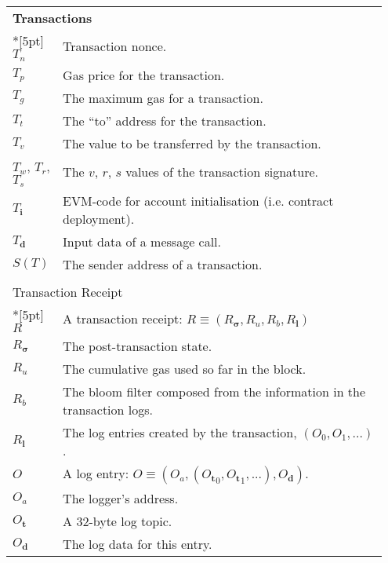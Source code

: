 \documentclass[9pt,oneside]{amsart}
\begin{document}
\begin{longtable}{p{0.10\linewidth}p{0.85\linewidth}}
\vspace{5pt} \\
\midrule
\multicolumn{2}{l}{\textbf{Transactions}} \\*[5pt]
$T_n$ & Transaction nonce. \\
$T_p$ & Gas price for the transaction. \\
$T_g$ & The maximum gas for a transaction. \\
$T_t$ & The ``to'' address for the transaction. \\
$T_v$ & The value to be transferred by the transaction. \\
$T_w$, $T_r$, $T_s$ & The $v$, $r$, $s$ values of the transaction signature. \\
$T_\mathbf{i}$ & EVM-code for account initialisation (i.e. contract
deployment). \\
$T_\mathbf{d}$ & Input data of a message call. \\
$S(T)$ & The sender address of a transaction. \\

\vspace{5pt} \\
\multicolumn{2}{l}{Transaction Receipt} \\*[5pt]
$R$ & A transaction receipt: $R \equiv (R_{\boldsymbol{\sigma}}, R_u, R_b,
R_\mathbf{l})$ \\
$R_{\boldsymbol{\sigma}}$ & The post-transaction state. \\
$R_u$ & The cumulative gas used so far in the block. \\
$R_b$ & The bloom filter composed from the information in the transaction logs. \\
$R_\mathbf{l}$ & The log entries created by the transaction, $(O_0, O_1, ...)$. \\
$O$ & A log entry: $O \equiv (O_a, ({O_\mathbf{t}}_0, {O_\mathbf{t}}_1, ...),
O_\mathbf{d})$. \\
$O_a$ & The logger's address. \\
$O_\mathbf{t}$ & A 32-byte log topic. \\
$O_\mathbf{d}$ & The log data for this entry. \\


\end{longtable}
\end{document}
